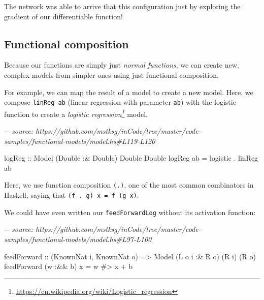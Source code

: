 \documentclass[]{article}
\newenvironment{Shaded}{}{}
\newcommand{\CommentTok}[1]{\textcolor[rgb]{0.38,0.63,0.69}{\textit{#1}}}
\newcommand{\DataTypeTok}[1]{\textcolor[rgb]{0.56,0.13,0.00}{#1}}
\newcommand{\NormalTok}[1]{#1}
\newcommand{\OperatorTok}[1]{\textcolor[rgb]{0.40,0.40,0.40}{#1}}
\newcommand{\OtherTok}[1]{\textcolor[rgb]{0.00,0.44,0.13}{#1}}
\renewcommand{\href}[2]{#2\footnote{\url{#1}}}
\begin{document}
The network was able to arrive that this configuration just by exploring the
gradient of our differentiable function!

\subsection{Functional composition}\label{functional-composition}

Because our functions are simply just \emph{normal functions}, we can create
new, complex models from simpler ones using just functional composition.

For example, we can map the result of a model to create a new model. Here, we
compose \texttt{linReg\ ab} (linear regression with parameter \texttt{ab}) with
the logistic function to create a
\emph{\href{https://en.wikipedia.org/wiki/Logistic_regression}{logistic
regression}} model.

\begin{Shaded}
\begin{Highlighting}[]
\CommentTok{{-}{-} source: https://github.com/mstksg/inCode/tree/master/code{-}samples/functional{-}models/model.hs\#L119{-}L120}

\OtherTok{logReg ::} \DataTypeTok{Model}\NormalTok{ (}\DataTypeTok{Double} \OperatorTok{:\&} \DataTypeTok{Double}\NormalTok{) }\DataTypeTok{Double} \DataTypeTok{Double}
\NormalTok{logReg ab }\OtherTok{=}\NormalTok{ logistic }\OperatorTok{.}\NormalTok{ linReg ab}
\end{Highlighting}
\end{Shaded}

Here, we use function composition \texttt{(.)}, one of the most common
combinators in Haskell, saying that \texttt{(f\ .\ g)\ x\ =\ f\ (g\ x)}.

We could have even written our \texttt{feedForwardLog} without its activation
function:

\begin{Shaded}
\begin{Highlighting}[]
\CommentTok{{-}{-} source: https://github.com/mstksg/inCode/tree/master/code{-}samples/functional{-}models/model.hs\#L97{-}L100}

\NormalTok{feedForward}
\OtherTok{    ::}\NormalTok{ (}\DataTypeTok{KnownNat}\NormalTok{ i, }\DataTypeTok{KnownNat}\NormalTok{ o)}
    \OtherTok{=\textgreater{}} \DataTypeTok{Model}\NormalTok{ (}\DataTypeTok{L}\NormalTok{ o i }\OperatorTok{:\&} \DataTypeTok{R}\NormalTok{ o) (}\DataTypeTok{R}\NormalTok{ i) (}\DataTypeTok{R}\NormalTok{ o)}
\NormalTok{feedForward (w }\OperatorTok{:\&\&}\NormalTok{ b) x }\OtherTok{=}\NormalTok{ w }\OperatorTok{\#\textgreater{}}\NormalTok{ x }\OperatorTok{+}\NormalTok{ b}
\end{Highlighting}
\end{Shaded}
\end{document}
